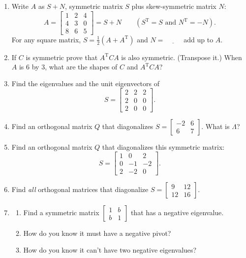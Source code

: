 \documentclass[14pt, a4paper]{article}
\begin{document}
\begin{enumerate}
    \item Write $A$ as $S + N$, symmetric matrix $S$ plus skew-symmetric matrix $N$:
          \[
              A = \begin{bmatrix} 1 & 2 & 4 \\ 4 & 3 & 0 \\ 8 & 6 & 5 \end{bmatrix} = S + N \qquad (S^{\mathrm{T}} = S \text{ and } N^{\mathrm{T}} = -N).
          \]
          For any square matrix, $S = \frac{1}{2}(A + A^{\mathrm{T}})$ and $N = \underline{\hspace{1cm}}$ add up to $A$.

    \item If $C$ is symmetric prove that $A^{\mathrm{T}}CA$ is also symmetric. (Transpose it.) When $A$ is 6 by 3, what are the shapes of $C$ and $A^{\mathrm{T}}CA$?

    \item Find the eigenvalues and the unit eigenvectors of
          \[
              S = \begin{bmatrix} 2 & 2 & 2 \\ 2 & 0 & 0 \\ 2 & 0 & 0 \end{bmatrix} .
          \]

    \item Find an orthogonal matrix $Q$ that diagonalizes $S = \begin{bmatrix} -2 & 6 \\ 6 & 7 \end{bmatrix}$. What is $\Lambda$?

    \item Find an orthogonal matrix $Q$ that diagonalizes this symmetric matrix:
          \[
              S = \begin{bmatrix} 1 & 0 & 2 \\ 0 & -1 & -2 \\ 2 & -2 & 0 \end{bmatrix} .
          \]

    \item Find \textit{all} orthogonal matrices that diagonalize $S = \begin{bmatrix} 9 & 12 \\ 12 & 16 \end{bmatrix}$.

    \item
          \begin{enumerate}
              \item Find a symmetric matrix $\begin{bmatrix} 1 & b \\ b & 1 \end{bmatrix}$ that has a negative eigenvalue.
              \item How do you know it must have a negative pivot?
              \item How do you know it can't have two negative eigenvalues?
          \end{enumerate}


\end{enumerate}
\end{document}
